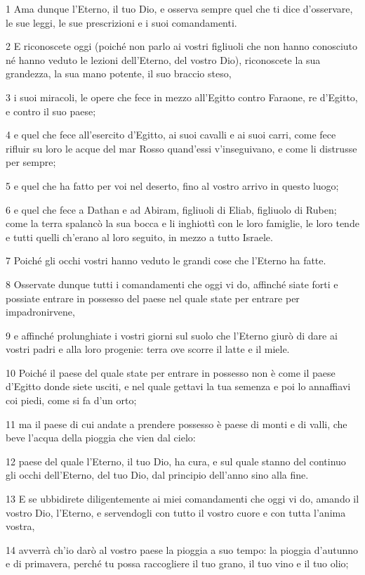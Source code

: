 \par 1 Ama dunque l'Eterno, il tuo Dio, e osserva sempre quel che ti dice d'osservare, le sue leggi, le sue prescrizioni e i suoi comandamenti.
\par 2 E riconoscete oggi (poiché non parlo ai vostri figliuoli che non hanno conosciuto né hanno veduto le lezioni dell'Eterno, del vostro Dio), riconoscete la sua grandezza, la sua mano potente, il suo braccio steso,
\par 3 i suoi miracoli, le opere che fece in mezzo all'Egitto contro Faraone, re d'Egitto, e contro il suo paese;
\par 4 e quel che fece all'esercito d'Egitto, ai suoi cavalli e ai suoi carri, come fece rifluir su loro le acque del mar Rosso quand'essi v'inseguivano, e come li distrusse per sempre;
\par 5 e quel che ha fatto per voi nel deserto, fino al vostro arrivo in questo luogo;
\par 6 e quel che fece a Dathan e ad Abiram, figliuoli di Eliab, figliuolo di Ruben; come la terra spalancò la sua bocca e li inghiottì con le loro famiglie, le loro tende e tutti quelli ch'erano al loro seguito, in mezzo a tutto Israele.
\par 7 Poiché gli occhi vostri hanno veduto le grandi cose che l'Eterno ha fatte.
\par 8 Osservate dunque tutti i comandamenti che oggi vi do, affinché siate forti e possiate entrare in possesso del paese nel quale state per entrare per impadronirvene,
\par 9 e affinché prolunghiate i vostri giorni sul suolo che l'Eterno giurò di dare ai vostri padri e alla loro progenie: terra ove scorre il latte e il miele.
\par 10 Poiché il paese del quale state per entrare in possesso non è come il paese d'Egitto donde siete usciti, e nel quale gettavi la tua semenza e poi lo annaffiavi coi piedi, come si fa d'un orto;
\par 11 ma il paese di cui andate a prendere possesso è paese di monti e di valli, che beve l'acqua della pioggia che vien dal cielo:
\par 12 paese del quale l'Eterno, il tuo Dio, ha cura, e sul quale stanno del continuo gli occhi dell'Eterno, del tuo Dio, dal principio dell'anno sino alla fine.
\par 13 E se ubbidirete diligentemente ai miei comandamenti che oggi vi do, amando il vostro Dio, l'Eterno, e servendogli con tutto il vostro cuore e con tutta l'anima vostra,
\par 14 avverrà ch'io darò al vostro paese la pioggia a suo tempo: la pioggia d'autunno e di primavera, perché tu possa raccogliere il tuo grano, il tuo vino e il tuo olio;
